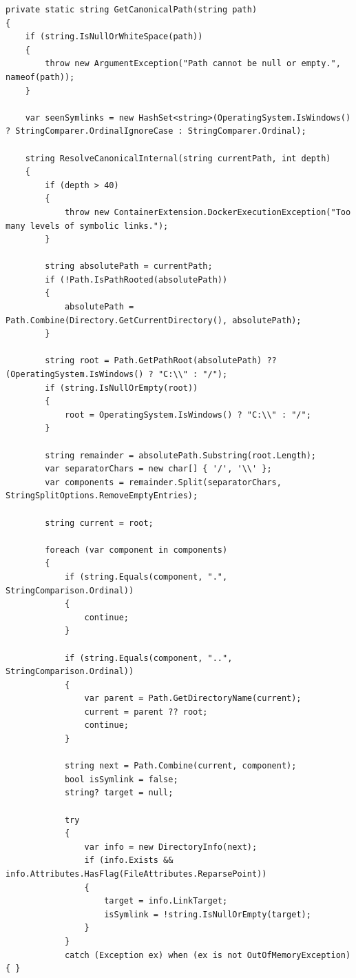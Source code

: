\begin{lstlisting}[language=CSharp, caption={Path Canonicalization implementation}, label={lst:canonicalization}]
private static string GetCanonicalPath(string path)
{
    if (string.IsNullOrWhiteSpace(path))
    {
        throw new ArgumentException("Path cannot be null or empty.", nameof(path));
    }

    var seenSymlinks = new HashSet<string>(OperatingSystem.IsWindows() ? StringComparer.OrdinalIgnoreCase : StringComparer.Ordinal);

    string ResolveCanonicalInternal(string currentPath, int depth)
    {
        if (depth > 40)
        {
            throw new ContainerExtension.DockerExecutionException("Too many levels of symbolic links.");
        }

        string absolutePath = currentPath;
        if (!Path.IsPathRooted(absolutePath))
        {
            absolutePath = Path.Combine(Directory.GetCurrentDirectory(), absolutePath);
        }

        string root = Path.GetPathRoot(absolutePath) ?? (OperatingSystem.IsWindows() ? "C:\\" : "/");
        if (string.IsNullOrEmpty(root))
        {
            root = OperatingSystem.IsWindows() ? "C:\\" : "/";
        }

        string remainder = absolutePath.Substring(root.Length);
        var separatorChars = new char[] { '/', '\\' };
        var components = remainder.Split(separatorChars, StringSplitOptions.RemoveEmptyEntries);

        string current = root;

        foreach (var component in components)
        {
            if (string.Equals(component, ".", StringComparison.Ordinal))
            {
                continue;
            }

            if (string.Equals(component, "..", StringComparison.Ordinal))
            {
                var parent = Path.GetDirectoryName(current);
                current = parent ?? root;
                continue;
            }

            string next = Path.Combine(current, component);
            bool isSymlink = false;
            string? target = null;

            try
            {
                var info = new DirectoryInfo(next);
                if (info.Exists && info.Attributes.HasFlag(FileAttributes.ReparsePoint))
                {
                    target = info.LinkTarget;
                    isSymlink = !string.IsNullOrEmpty(target);
                }
            }
            catch (Exception ex) when (ex is not OutOfMemoryException) { }


\end{lstlisting}
